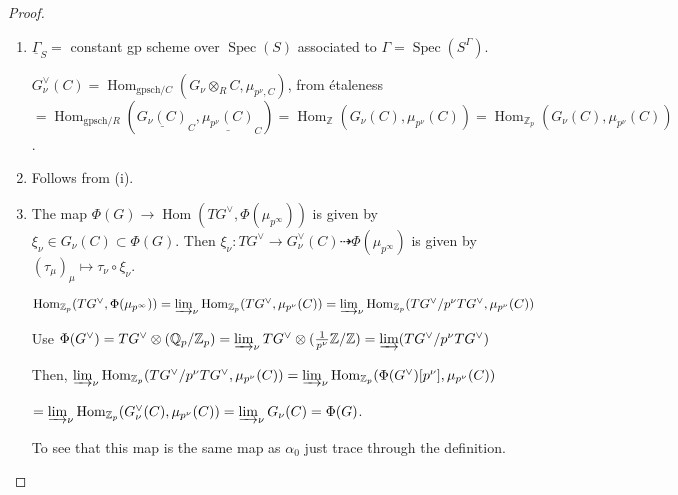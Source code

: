\documentclass{article}
\theoremstyle{definition}
\numberwithin{theorem}{subsection}
\begin{document}
    \begin{proof}
        \begin{enumerate}[label=\roman*)]
            \item \(\underline{\Gamma}_S =\) constant gp scheme over \(\operatorname{Spec}(S)\) associated to \(\Gamma = \operatorname{Spec}(S^\Gamma)\).
            
            \(G_\nu^\vee(C) = \operatorname{Hom}_{\text{gpsch} / C}(G_\nu \otimes_R C, \mu_{p^\nu, C})\), from \'etaleness \(= \operatorname{Hom}_{\text{gpsch} / R}(\underline{G_\nu(C)}_C, \underline{\mu_{p^\nu}(C)}_C) = \operatorname{Hom}_{\mathbb{Z}}(G_\nu(C), \mu_{p^\nu}(C)) = \operatorname{Hom}_{\mathbb{Z}_p}(G_\nu(C), \mu_{p^\nu}(C))\).
            
            \item Follows from (i).
            \item The map \(\Phi(G) \to \operatorname{Hom}(TG^\vee, \Phi(\mu_{p^{\infty}}))\) is given by \(\xi_\nu \in G_\nu(C) \subset \Phi(G)\). Then \(\xi_\nu: TG^\vee \to G_\nu^\vee(C) \dasharrow \Phi(\mu_{p^{\infty}})\) is given by \((\tau_\mu)_\mu \mapsto \tau_\nu \circ \xi_\nu\).
            
            \(\operatorname{Hom}_{\mathbb{Z}_p}(TG^\vee, \Phi(\mu_{p^{\infty}})) = \varinjlim_\nu \operatorname{Hom}_{\mathbb{Z}_p} (TG^\vee, \mu_{p^\nu}(C)) = \varinjlim_\nu \operatorname{Hom}_{\mathbb{Z}_p}(TG^\vee / p^\nu TG^\vee, \mu_{p^\nu}(C))\)
            
            Use \(\Phi(G^\vee) = TG^\vee \otimes (\mathbb{Q}_p / \mathbb{Z}_p) = \varinjlim_\nu TG^\vee \otimes (\frac{1}{p^\nu}\mathbb{Z} / \mathbb{Z}) = \varinjlim (TG^\vee / p^\nu TG^\vee)\)
            
            Then, \(\varinjlim_\nu \operatorname{Hom}_{\mathbb{Z}_p}(TG^\vee / p^\nu TG^\vee, \mu_{p^\nu}(C)) = \varinjlim_\nu \operatorname{Hom}_{\mathbb{Z}_p}(\Phi(G^\vee)[p^\nu], \mu_{p^\nu}(C))\)

            \(=\varinjlim_\nu \operatorname{Hom}_{\mathbb{Z}_p}(G_\nu^\vee(C), \mu_{p^\nu}(C)) = \varinjlim_\nu G_\nu(C) = \Phi(G)\).

            To see that this map is the same map as \(\alpha_0\) just trace through the definition.
        \end{enumerate} 
    \end{proof}
\end{document}
